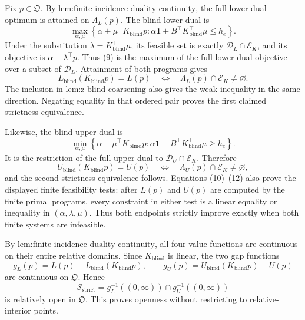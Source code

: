 Fix \(p\in\mathfrak O\).  By \(\text{lem:finite-incidence-duality-continuity}\), the full lower dual optimum is attained on \(\Lambda_L(p)\).  The blind lower dual is
\[
\max_{\alpha,\mu}\left\{\alpha+\mu^{\top}K_{\mathrm{blind}}p:
\alpha\mathbf 1+B^{\top}K_{\mathrm{blind}}^{\top}\mu\leq h_e\right\}.
\tag{9}
\]
Under the substitution \(\lambda=K_{\mathrm{blind}}^{\top}\mu\), its feasible set is exactly \(\mathcal D_L\cap\mathcal E_K\), and its objective is \(\alpha+\lambda^{\top}p\).  Thus (9) is the maximum of the full lower-dual objective over a subset of \(\mathcal D_L\).  Attainment of both programs gives
\[
L_{\mathrm{blind}}(K_{\mathrm{blind}}p)=L(p)
\quad\Longleftrightarrow\quad
\Lambda_L(p)\cap\mathcal E_K\neq\varnothing.
\tag{10}
\]
The inclusion in \(\text{lem:z-blind-coarsening}\) also gives the weak inequality in the same direction.  Negating equality in that ordered pair proves the first claimed strictness equivalence.

Likewise, the blind upper dual is
\[
\min_{\alpha,\mu}\left\{\alpha+\mu^{\top}K_{\mathrm{blind}}p:
\alpha\mathbf 1+B^{\top}K_{\mathrm{blind}}^{\top}\mu\geq h_e\right\}.
\tag{11}
\]
It is the restriction of the full upper dual to \(\mathcal D_U\cap\mathcal E_K\).  Therefore
\[
U_{\mathrm{blind}}(K_{\mathrm{blind}}p)=U(p)
\quad\Longleftrightarrow\quad
\Lambda_U(p)\cap\mathcal E_K\neq\varnothing,
\tag{12}
\]
and the second strictness equivalence follows.  Equations (10)--(12) also prove the displayed finite feasibility tests: after \(L(p)\) and \(U(p)\) are computed by the finite primal programs, every constraint in either test is a linear equality or inequality in \((\alpha,\lambda,\mu)\).  Thus both endpoints strictly improve exactly when both finite systems are infeasible.

By \(\text{lem:finite-incidence-duality-continuity}\), all four value functions are continuous on their entire relative domains.  Since \(K_{\mathrm{blind}}\) is linear, the two gap functions
\[
g_L(p)=L(p)-L_{\mathrm{blind}}(K_{\mathrm{blind}}p),
\qquad
g_U(p)=U_{\mathrm{blind}}(K_{\mathrm{blind}}p)-U(p)
\tag{13}
\]
are continuous on \(\mathfrak O\).  Hence
\[
\mathcal S_{\mathrm{strict}}=g_L^{-1}((0,\infty))\cap g_U^{-1}((0,\infty))
\tag{14}
\]
is relatively open in \(\mathfrak O\).  This proves openness without restricting to relative-interior points.


